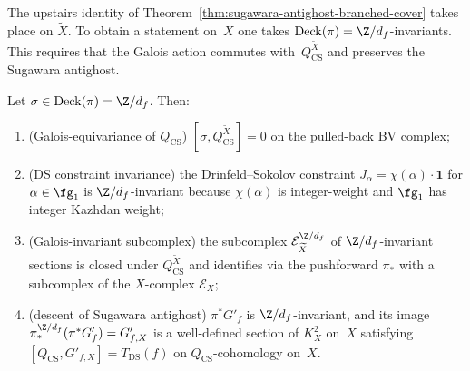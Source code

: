 The upstairs identity of
Theorem~\ref{thm:sugawara-antighost-branched-cover} takes place on
$\widetilde X$. To obtain a statement on~$X$ one takes
$\mathrm{Deck}(\pi) = \Z/d_{f}$-invariants. This requires that the
Galois action commutes with~$Q_{\mathrm{CS}}^{\widetilde X}$ and
preserves the Sugawara antighost.

\begin{theorem}
\label{thm:galois-invariance-descent}
Let $\sigma \in \mathrm{Deck}(\pi) = \Z/d_{f}$. Then:
\begin{enumerate}[label=\textup{(\alph*)},nosep]
\item \textup{(Galois-equivariance of $Q_{\mathrm{CS}}$)}
 $[\sigma, Q_{\mathrm{CS}}^{\widetilde X}] = 0$ on the
 pulled-back BV complex;
\item \textup{(DS constraint invariance)} the Drinfeld--Sokolov
 constraint $J_{\alpha} = \chi(\alpha) \cdot \mathbf{1}$ for
 $\alpha \in \fg_{1}$ is $\Z/d_{f}$-invariant because
 $\chi(\alpha)$ is integer-weight and $\fg_{1}$ has integer
 Kazhdan weight;
\item \textup{(Galois-invariant subcomplex)} the subcomplex
 $\mathcal{E}^{\Z/d_{f}}_{\widetilde X}$ of $\Z/d_{f}$-invariant
 sections is closed under $Q_{\mathrm{CS}}^{\widetilde X}$ and
 identifies via the pushforward $\pi_{*}$ with a subcomplex of
 the $X$-complex $\mathcal{E}_{X}$;
\item \textup{(descent of Sugawara antighost)}
 $\pi^{*}G'_{f}$ is $\Z/d_{f}$-invariant, and its image
 $\pi_{*}^{\Z/d_{f}}(\pi^{*}G'_{f}) = G'_{f,X}$ is a
 well-defined section of $K_{X}^{2}$ on~$X$ satisfying
 $[Q_{\mathrm{CS}}, G'_{f,X}] = T_{\mathrm{DS}}(f)$ on
 $Q_{\mathrm{CS}}$-cohomology on~$X$.
\end{enumerate}
\end{theorem}

